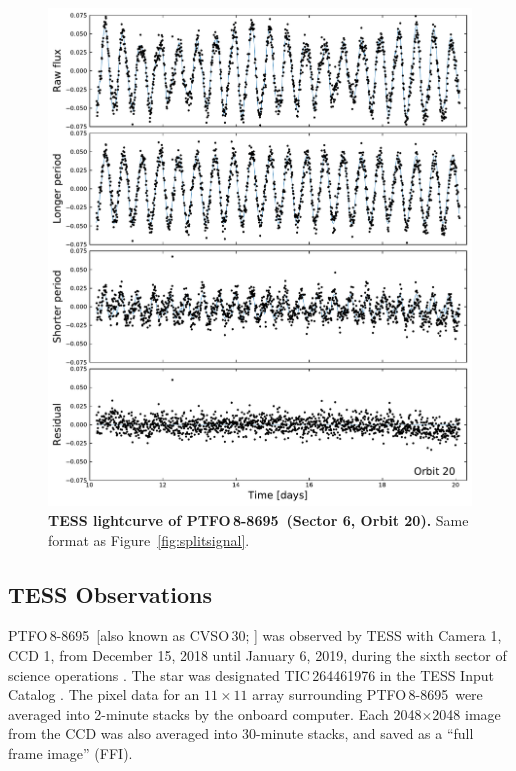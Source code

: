 \documentclass[12pt,twocolumn,tighten]{aastex62}
\newcommand{\ptfo}{PTFO$\,$8-8695}
\begin{document}
\begin{figure}[hbtp]
	\begin{center}
		\leavevmode
		\includegraphics[width=1\textwidth]{f2.pdf}
	\end{center}
	\vspace{-0.7cm}
  \caption{ {\bf TESS lightcurve of \ptfo\ (Sector 6, Orbit 20).} Same
  format as Figure~\ref{fig:splitsignal}.
  \label{fig:splitsignalii}
	}
\end{figure}

\subsection{TESS Observations}

\ptfo\ [also known as CVSO\,30; \citealt{briceno_cida_2005}] was
observed by TESS with Camera 1, CCD 1, from December 15, 2018 until
January 6, 2019, during the sixth sector of science operations
\citep{ricker_transiting_2015}.  The star was designated
TIC\,264461976 in the TESS Input Catalog
\citep{stassun_TIC_2018,stassun_TIC8_2019}.  The pixel data for an
$11\times11$ array surrounding \ptfo\ were averaged into 2-minute
stacks by the onboard computer.  Each 2048$\times$2048 image from the
CCD was also averaged into 30-minute stacks, and saved as a ``full
frame image'' (FFI).
\end{document}
